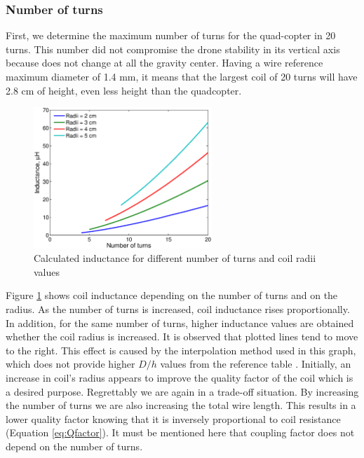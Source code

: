 				\subsubsection{Number of turns}
First, we determine the maximum number of turns for the quad-copter in 20 turns. This number did not compromise the drone stability in its vertical axis because does not change at all the gravity center. Having a wire reference maximum diameter of 1.4 mm, it means that the largest coil of 20 turns will have 2.8 cm of height, even less height than the quadcopter.

\begin{figure}[htb]
\begin{center}
\includegraphics[width=0.6\textwidth]{./images/LvsN}
\caption{Calculated inductance for different number of turns and coil radii values}
\label{F:LvsN}
\end{center}
\end{figure}

Figure \ref{F:LvsN} shows coil inductance depending on the number of turns and on the radius. As the number of turns is increased, coil inductance rises proportionally. In addition, for the same number of turns, higher inductance values are obtained whether the coil radius is increased. It is observed that plotted lines tend to move to the right. This effect is caused by the interpolation method used in this graph, which does not provide higher $D/h$ values from the reference table \cite{WaiKaiChen}. Initially, an increase in coil's radius appears to improve the quality factor of the coil which is a desired purpose. Regrettably we are again in a trade-off situation. By increasing the number of turns we are also increasing the total wire length. This results in a lower quality factor knowing that it is inversely proportional to coil resistance (Equation \ref{eq:Qfactor}). It must be mentioned here that coupling factor does not depend on the number of turns.









